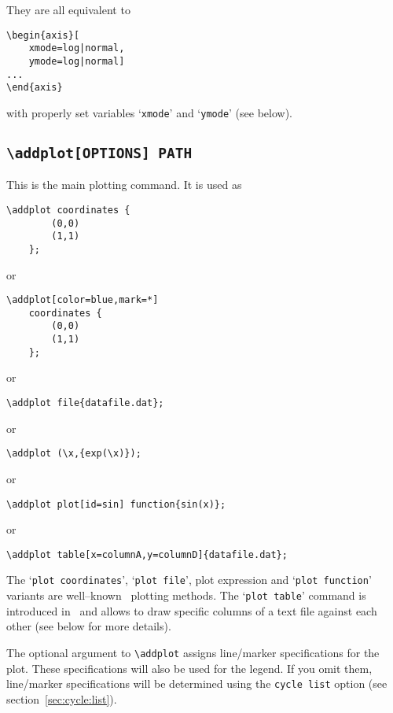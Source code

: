 They are all equivalent to
\begin{lstlisting}
\begin{axis}[
	xmode=log|normal,
	ymode=log|normal]
...
\end{axis}
\end{lstlisting}
with properly set variables `\texttt{xmode}' and `\texttt{ymode}' (see below).

\subsection{\texttt{\textbackslash addplot[OPTIONS] PATH}}
This is the main plotting command. It is used as
\begin{lstlisting}
\addplot coordinates {
		(0,0)
		(1,1)
	};
\end{lstlisting}
or
\begin{lstlisting}
\addplot[color=blue,mark=*]
	coordinates {
		(0,0)
		(1,1)
	};
\end{lstlisting}
or
\begin{lstlisting}
\addplot file{datafile.dat};
\end{lstlisting}
or
\begin{lstlisting}
\addplot (\x,{exp(\x)});
\end{lstlisting}
or
\begin{lstlisting}
\addplot plot[id=sin] function{sin(x)};
\end{lstlisting}
or
\begin{lstlisting}
\addplot table[x=columnA,y=columnD]{datafile.dat};
\end{lstlisting}
The `\texttt{plot coordinates}', `\texttt{plot file}', plot expression and `\texttt{plot function}' variants are well--known \Tikz\ plotting methods. The `\texttt{plot table}' command is introduced in \PGFPlots\ and allows to draw specific columns of a text file against each other (see below for more details).

The optional argument to \lstinline!\addplot! assigns line/marker specifications for the plot. These specifications will also be used for the legend. If you omit them, line/marker specifications will be determined using the \texttt{cycle list}  option (see section~\ref{sec:cycle:list}).

